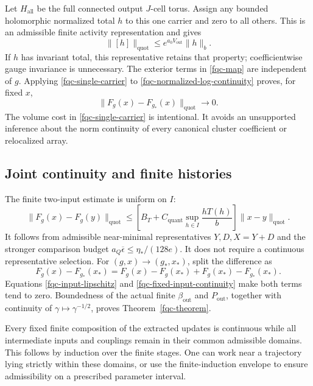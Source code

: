 Let $H_{\mathrm{all}}$ be the full connected output $J$-cell
torus. Assign any bounded holomorphic normalized total $h$ to
this one carrier and zero to all others. This is an admissible
finite activity representation and gives
\begin{equation}
 \lVert[h]\rVert_{\mathrm{quot}}
       \leq e^{a_0V_{\mathrm{out}}}\lVert h\rVert_b.
 \label{fqc-single-carrier}
\end{equation}
If $h$ has invariant total, this representative retains that
property; coefficientwise gauge invariance is unnecessary.
The exterior terms in \eqref{fqc-map} are independent of $g$.
Applying \eqref{fqc-single-carrier} to
\eqref{fqc-normalized-log-continuity} proves, for fixed $x$,
\begin{equation}
 \lVert F_g(x)-F_{g_*}(x)\rVert_{\mathrm{quot}}
       \longrightarrow0.
 \label{fqc-fixed-input-continuity}
\end{equation}
The volume cost in \eqref{fqc-single-carrier} is intentional.
It avoids an unsupported inference about the norm continuity
of every canonical cluster coefficient or relocalized array.

\subsection{Joint continuity and finite histories}
\label{fqc-joint-section}

The finite two-input estimate is uniform on $I$:
\begin{equation}
 \lVert F_g(x)-F_g(y)\rVert_{\mathrm{quot}}
 \leq
 \left[B_T+C_{\mathrm{quant}}
                  \sup_{h\in I}\frac{hT(h)}b\right]
       \lVert x-y\rVert_{\mathrm{quot}}.
 \label{fqc-input-lipschitz}
\end{equation}
It follows from admissible near-minimal representatives
$Y,D,X=Y+D$ and the stronger comparison budget
$a_Q\overline\epsilon\leq\eta_*/(128e)$. It does not require
a continuous representative selection. For $(g,x)\to(g_*,x_*)$,
split the difference as
\[
 F_g(x)-F_{g_*}(x_*)
   =F_g(x)-F_g(x_*)+F_g(x_*)-F_{g_*}(x_*).
\]
Equations \eqref{fqc-input-lipschitz} and
\eqref{fqc-fixed-input-continuity} make both terms tend to
zero. Boundedness of the actual finite $\beta_{\mathrm{out}}$
and $P_{\mathrm{out}}$, together with continuity of
$\gamma\mapsto\gamma^{-1/2}$, proves
Theorem~\ref{fqc-theorem}.

Every fixed finite composition of the extracted updates is
continuous while all intermediate inputs and couplings remain
in their common admissible domains. This follows by induction
over the finite stages. One can work near a trajectory lying
strictly within these domains, or use the finite-induction
envelope to ensure admissibility on a prescribed parameter
interval.

